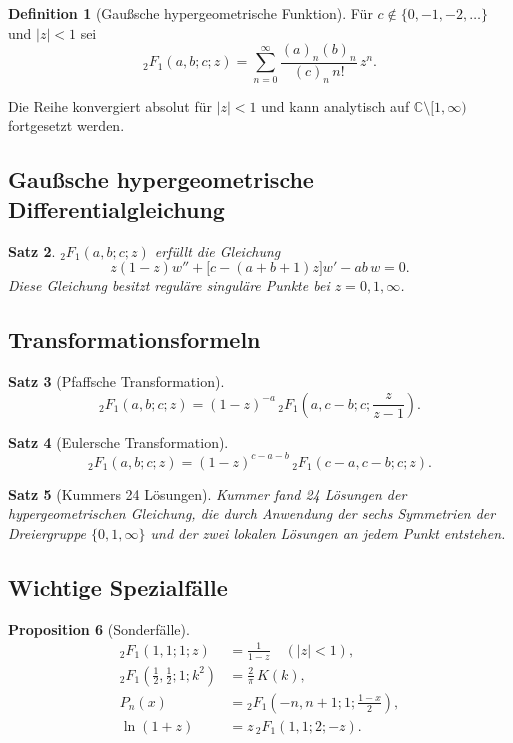 \documentclass[12pt,a4paper]{amsart}
\newtheorem{theorem}{Satz}[section]
\newtheorem{proposition}[theorem]{Proposition}
\theoremstyle{definition}
\newtheorem{definition}[theorem]{Definition}
\begin{document}
\begin{definition}[Gaußsche hypergeometrische Funktion]\label{def:2F1_de}
Für \(c \notin \{0,-1,-2,\ldots\}\) und \(|z| < 1\) sei
\[
  {}_2F_1(a,b;c;z)
  = \sum_{n=0}^\infty \frac{(a)_n(b)_n}{(c)_n\,n!}\,z^n.
\]
\end{definition}

Die Reihe konvergiert absolut für \(|z| < 1\) und kann analytisch auf
\(\mathbb{C}\setminus[1,\infty)\) fortgesetzt werden.

\subsection{Gaußsche hypergeometrische Differentialgleichung}

\begin{theorem}
\({}_2F_1(a,b;c;z)\) erfüllt die Gleichung
\[
  z(1-z)w'' + \bigl[c-(a+b+1)z\bigr]w' - ab\,w = 0.
\]
Diese Gleichung besitzt reguläre singuläre Punkte bei \(z = 0, 1, \infty\).
\end{theorem}

\subsection{Transformationsformeln}

\begin{theorem}[Pfaffsche Transformation]
\[
  {}_2F_1(a,b;c;z) = (1-z)^{-a}\,{}_2F_1\!\left(a,c-b;c;\frac{z}{z-1}\right).
\]
\end{theorem}

\begin{theorem}[Eulersche Transformation]
\[
  {}_2F_1(a,b;c;z) = (1-z)^{c-a-b}\,{}_2F_1(c-a,c-b;c;z).
\]
\end{theorem}

\begin{theorem}[Kummers 24 Lösungen]
Kummer fand 24 Lösungen der hypergeometrischen Gleichung, die durch Anwendung der sechs
Symmetrien der Dreiergruppe \(\{0,1,\infty\}\) und der zwei lokalen Lösungen an jedem
Punkt entstehen.
\end{theorem}

\subsection{Wichtige Spezialfälle}

\begin{proposition}[Sonderfälle]
\begin{align*}
  {}_2F_1(1,1;1;z) &= \frac{1}{1-z} \quad (|z|<1),\\
  {}_2F_1\!\left(\tfrac{1}{2},\tfrac{1}{2};1;k^2\right) &= \frac{2}{\pi}\,K(k),\\
  P_n(x) &= {}_2F_1\!\left(-n,n+1;1;\tfrac{1-x}{2}\right),\\
  \ln(1+z) &= z\,{}_2F_1(1,1;2;-z).
\end{align*}
\end{proposition}
\end{document}
